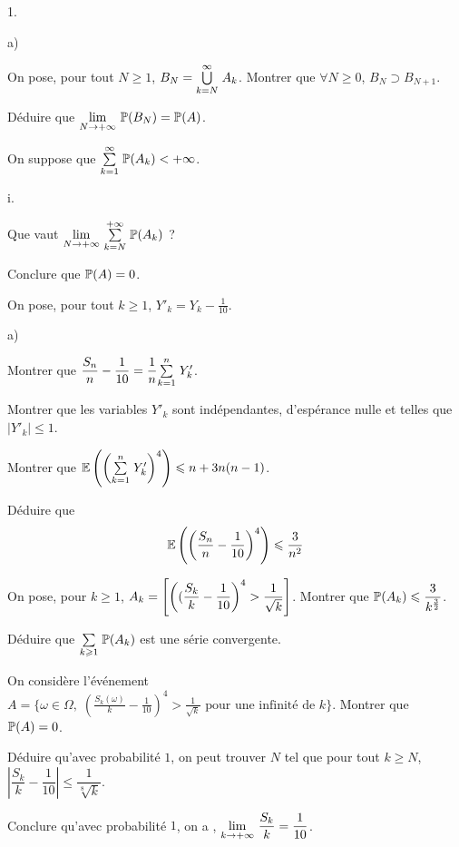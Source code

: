 \documentclass[11pt]{article}%
\begin{document}
\begin{noliste}{1.}
\begin{noliste}{a)}
\item On pose, pour tout $N\geq 1$, $B_N={\textstyle\bigcup\limits_{k=N}^{\infty}}\hspace{.1cm} A_k$. 
Montrer que $\forall N\geq 0$, $B_N\supset B_{N+1}$.

\item Déduire que ${\displaystyle \lim_{N\to +\infty} \ } \mathbb{P}(B_N)=\mathbb{P}(A)$.

\item On suppose que ${\textstyle\sum\limits_{k=1}^{\infty}}\hspace{.1cm} \mathbb{P}(A_k)<+\infty$. 
\begin{noliste}{i.}
\item Que vaut 
${\displaystyle \lim_{N\to+\infty} \ } {\textstyle\sum\limits_{k=N}^{+\infty}}\hspace{.1cm} \mathbb{P}(A_k)$ ?

\item Conclure que $\mathbb{P}(A)=0$.
\end{noliste}
\end{noliste}

\item On pose, pour tout $k\geq 1$, $Y'_k=Y_k-\frac{1}{10}$.

\begin{noliste}{a)}
\item Montrer que 
$\dfrac{S_n}{n}-\dfrac{1}{10}=\dfrac{1}{n} {\textstyle\sum\limits_{k=1}^{n}}\hspace{.1cm} Y'_k$.

\item Montrer que les variables $Y'_k$  sont indépendantes, 
d'espérance nulle et telles que  $\vert Y'_k \vert \leq 1$. 

\item Montrer que 
$\mathbb{E}\left(\left({\textstyle\sum\limits_{k=1}^{n}}\hspace{.1cm} Y'_k\right)^4\right)\leqslant n+3n(n-1)$.

\item Déduire que 
\[
\mathbb{E}\left(\left(\dfrac{S_n}{n}-\dfrac{1}{10}\right)^4\right)\leqslant 
\dfrac{3}{n^2}
\]

\item On pose, pour $k\geq 1$, $A_k=\left[ {\left((\dfrac{S_k}{k}-
\dfrac{1}{10}\right)^4 > \dfrac{1}{\sqrt{k}}} \right]$. Montrer que 
$\mathbb{P}(A_k)\leqslant \dfrac{3}{k^{\frac{3}{2}}}$.

\item Déduire que  ${\textstyle\sum\limits_{k\geqslant 1}^{}}\hspace{.1cm} \mathbb{P}(A_k)$ est une série 
convergente. 

\item On considère l'événement $A=\{\omega\in\Omega , \; 
\left(\frac{S_k(\omega)}{k}- \frac{1}{10}\right)^4 > 
\frac{1}{\sqrt{k}}\mbox{ pour une infinité de } k\}$. Montrer que 
$\mathbb{P}(A)=0$.

\item Déduire qu'avec probabilité $1$, on peut trouver $N$ tel que 
pour tout $k\geq N$,  
$\left\vert \dfrac{S_k}{k}-\dfrac{1}{10}\right\vert \leq 
\dfrac{1}{\sqrt[8]{k}}$.

\item Conclure qu'avec probabilité $1$, on a , 
${\displaystyle \lim_{k\to+\infty} \ }\dfrac{S_k}{k}=\dfrac{1}{10}$. 
\end{noliste}
\end{noliste}
\end{document}
